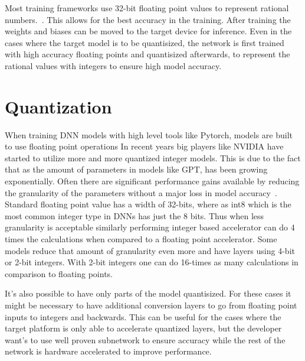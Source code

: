 \documentclass[12pt,a4paper,english
]{tunithesis}
\begin{document}
Most training frameworks use 32-bit floating point values to represent rational numbers.~\cite{paszke_pytorch_2019}\cite{tensorflow2015-whitepaper}. This allows for the best accuracy in the training. After training the weights and biases can be moved to the target device for inference. Even in the cases where the target model is to be quantisized, the network is first trained with high accuracy floating points and quantisized afterwards, to represent the rational values with integers to ensure high model accuracy.

\section{Quantization}
When training DNN models with high level tools like Pytorch, models are built to use floating point operations In recent years big players like NVIDIA have started to utilize more and more quantized integer models. This is due to the fact that as the amount of parameters in models like GPT, has been growing exponentially. Often there are significant performance gains available by reducing the granularity of the parameters without a major loss in model accuracy~\cite{krishnamoorthi_quantizing_2018,draghici_capabilities_2002}. Standard floating point value has a width of 32-bits, where as int8 which is the most common integer type in DNNs has just the 8 bits. Thus when less granularity is acceptable similarly performing integer based accelerator can do 4 times the calculations when compared to a floating point accelerator.
Some models reduce that amount of granularity even more and have layers using 4-bit or 2-bit integers. With 2-bit integers one can do 16-times as many calculations in comparison to floating points.

It's also possible to have only parts of the model quantisized. For these cases it might be necessary to have additional conversion layers to go from floating point inputs to integers and backwards. This can be useful for the cases where the target platform is only able to accelerate quantized layers, but the developer want's to use well proven subnetwork to ensure accuracy while the rest of the network is hardware accelerated to improve performance.
\end{document}
